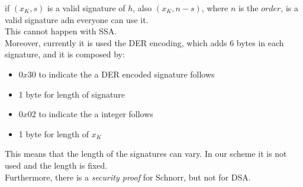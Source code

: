 if $(x_{K},s)$ is a valid signature of $h$, also $(x_{K},n-s)$, where $n$ is the $order$, is a valid signature adn everyone can use it.\\
This cannot happen with SSA.\\
Moreover, currently it is used the DER encoding, which adds 6 bytes in each signature, and it is composed by:
\begin{itemize}
	\item $0x30$ to indicate the a DER encoded signature follows
	\item 1 byte for length of signature
	\item $0x02$ to indicate the a integer follows
	\item 1 byte for length of $x_{K}$
\end{itemize}
This means that the length of the signatures can vary. In our scheme it is not used and the length is fixed.\\
Furthermore, there is a \textit{security proof} for Schnorr, but not for DSA.



